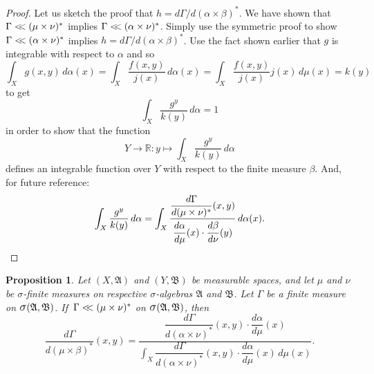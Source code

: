 \documentclass[
twoside=true,
paper=letter,
fontsize=9pt,
pagesize=auto,
leqno,
openany,
headsepline,
overfullrule,
]{scrbook}
\theoremstyle{plain}
\theoremstyle{plain}
\newtheorem{prop}[thm]{Proposition}
\theoremstyle{definition}
\theoremstyle{bfnoteitalic}
\theoremstyle{bfnoteroman}
\newcommand{\sigalg}[1]{\mathfrak{#1}}
\newcommand{\sagb}{\mathop{\hbox{\large{$\sigma$}}}\nolimits}
\newcommand{\textsigma}{\hbox{\large{$\sigma$}}\kern-1pt}
\newcommand{\R}{\mathbb{R}}
\newcommand{\sigmaalgebra}{\sigalg{A}}
\newcommand{\sigmaalgebraii}{\sigalg{B}}
\newcommand{\productsig}[2]{\sagb(#1,#2)}
\newcommand{\lilstrut}{\vphantom{\bigl(}}
\newcommand{\funcf}{f}
\newcommand{\funcg}{g}
\newcommand{\funcj}{j}
\newcommand{\funck}{k}
\newcommand{\functioniii}{h}
\newcommand{\measurespace}{X}
\newcommand{\measurespaceii}{Y}
\newcommand{\mspaceelt}{x}
\newcommand{\mspaceeltii}{y}
\newcommand{\abscont}{\mathrel{< \kern-3.5pt <}}
\newcommand{\measure}{\mu}
\newcommand{\measmu}{\mu}
\newcommand{\measureii}{\nu}
\newcommand{\measnu}{\nu}
\newcommand{\joint}{\Gamma}%
\newcommand{\measonprod}{\Gamma}%
\newcommand{\marginalone}{\alpha}%
\newcommand{\marginaltwo}{\beta}%
\begin{document}
\begin{proof}
Let us sketch the proof that
$\functioniii
=
d\measonprod / d(\marginalone\times\marginaltwo)^*$.
We have shown that 
$\measonprod \abscont (\measure\times\measureii)^*$
implies
$\measonprod \abscont (\marginalone\times\measureii)^*$. 
Simply use the symmetric proof to show 
$\measonprod \abscont (\marginalone\times\measureii)^*$
implies
$\functioniii
=
d\measonprod / d(\marginalone\times\marginaltwo)^*$.
Use the fact shown earlier that 
$\funcg$ is integrable with respect to $\marginalone$ and so
\[
\int_\measurespace\funcg(\mspaceelt,\mspaceeltii)\,d\marginalone(\mspaceelt)
=
\int_\measurespace
\frac{\funcf(\mspaceelt,\mspaceeltii)}{\funcj(\mspaceelt)}
\,d\marginalone(\mspaceelt)
=
\int_\measurespace
\frac{\funcf(\mspaceelt,\mspaceeltii)}{\funcj(\mspaceelt)}
\funcj(\mspaceelt)
\,d\measure(\mspaceelt)
=
\funck(\mspaceeltii)
\]
to get
\[
\int_\measurespace
\frac{\funcg^\mspaceeltii}{\funck(\mspaceeltii)}
\, d\marginalone
= 1
\]
in order to show that the function 
\[
\measurespaceii\to\R :
\mspaceeltii\mapsto
\int_\measurespace
\frac{\funcg^\mspaceeltii}{\funck(\mspaceeltii)}
\, d\marginalone
\]
defines an integrable function over $\measurespaceii$ with respect to the finite measure $\marginaltwo$.
And, for future reference:
\[
\int_\measurespace
\frac{\funcg^\mspaceeltii}{\funck(\mspaceeltii)}
\, d\marginalone
=
\int_\measurespace
\frac{\dfrac{d\joint}{d(\measmu\times\measnu)^*}
(\mspaceelt,\mspaceeltii)}
{\dfrac{d\marginalone\lilstrut}{d\measmu}(\mspaceelt)
\cdot
\dfrac{d\marginaltwo\lilstrut}{d\measnu}(\mspaceeltii)}
\,d\marginalone(\mspaceelt).
\]
\end{proof}




\begin{prop}\label{bayes_rule}
Let
$(\measurespace, \sigmaalgebra)$
and
$(\measurespaceii, \sigmaalgebraii)$
be measurable spaces, and let $\measure$ and $\measureii$
be \textsigma-finite measures on respective \textsigma-algebras
$\sigmaalgebra$ and $\sigmaalgebraii$.
Let $\measonprod$ be a finite measure on
$\productsig{\sigmaalgebra}{\sigmaalgebraii}$.
If $\,\measonprod \abscont (\measure\times\measureii)^*$ on
$\productsig{\sigmaalgebra}{\sigmaalgebraii}$,
then
\[
\dfrac{d\joint}{d(\measmu\times\marginaltwo)^*}(\mspaceelt,\mspaceeltii)
=
\dfrac{
\dfrac{d\joint}{d(\marginalone\times\measnu)^*}(\mspaceelt,\mspaceeltii)
\cdot
\dfrac{d\marginalone}{d\measmu}(\mspaceelt)
}
{
\displaystyle\int_\measurespace
\dfrac{d\joint}{d(\marginalone\times\measnu)^*}(\mspaceelt,\mspaceeltii)
\cdot
\dfrac{d\marginalone}{d\measmu}(\mspaceelt)\,
d\measmu(\mspaceelt)
}.
\]
\end{prop}
\end{document}
